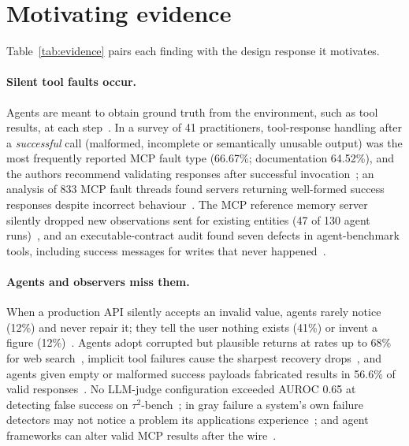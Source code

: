 \documentclass[10pt]{article}
\begin{document}
\section{Motivating evidence}
\label{sec:why}

Table~\ref{tab:evidence} pairs each finding with the design response it motivates.

\paragraph{Silent tool faults occur.} Agents are meant to obtain ground truth from the environment, such as tool results, at each step~\cite{anthropic2024agents}. In a survey of 41 practitioners, tool-response handling after a \emph{successful} call (malformed, incomplete or semantically unusable output) was the most frequently reported MCP fault type (66.67\%; documentation 64.52\%), and the authors recommend validating responses after successful invocation~\cite{taraghi2026realfaults}; an analysis of 833 MCP fault threads found servers returning well-formed success responses despite incorrect behaviour~\cite{owotogbe2026mcpfaults}. The MCP reference memory server silently dropped new observations sent for existing entities (47 of 130 agent runs)~\cite{mcp-memory-4887}, and an executable-contract audit found seven defects in agent-benchmark tools, including success messages for writes that never happened~\cite{bellibatlu2026contractaudit}.

\paragraph{Agents and observers miss them.} When a production API silently accepts an invalid value, agents rarely notice (12\%) and never repair it; they tell the user nothing exists (41\%) or invent a figure (12\%)~\cite{li2026silentprobe}. Agents adopt corrupted but plausible returns at rates up to 68\% for web search~\cite{yang2026overreliance}, implicit tool failures cause the sharpest recovery drops~\cite{zhu2026toolmaze}, and agents given empty or malformed success payloads fabricated results in 56.6\% of valid responses~\cite{singh2026scapegoats}. No LLM-judge configuration exceeded AUROC 0.65 at detecting false success on $\tau^2$-bench~\cite{advani2026falsesuccess}; in gray failure a system's own failure detectors may not notice a problem its applications experience~\cite{huang2017grayfailure}; and agent frameworks can alter valid MCP results after the wire~\cite{patodiya2026postwire}.
\end{document}
